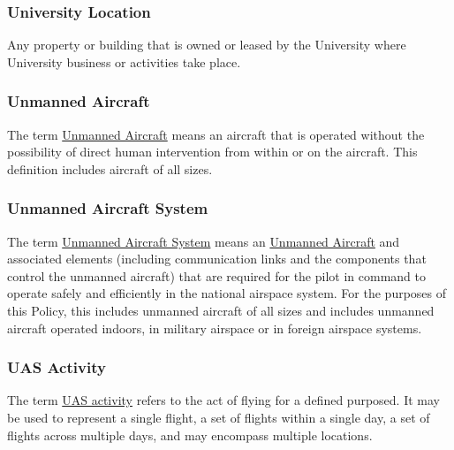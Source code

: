 \documentclass[
]{book}
\begin{document}
\hypertarget{UL}{%
\subsubsection*{University Location}\label{UL}}

Any property or building that is owned or leased by the University where University business or activities take place.



\hypertarget{UA}{%
\subsubsection*{Unmanned Aircraft}\label{UA}}

The term \protect\hyperlink{UA}{Unmanned Aircraft} means an aircraft that is operated without the possibility of direct human intervention from within or on the aircraft. This definition includes aircraft of all sizes.





\hypertarget{UAS}{%
\subsubsection*{Unmanned Aircraft System}\label{UAS}}

The term \protect\hyperlink{UAS}{Unmanned Aircraft System} means an \protect\hyperlink{UA}{Unmanned Aircraft} and associated elements (including communication links and the components that control the unmanned aircraft) that are required for the pilot in command to operate safely and efficiently in the national airspace system. For the purposes of this Policy, this includes unmanned aircraft of all sizes and includes unmanned aircraft operated indoors, in military airspace or in foreign airspace systems.







\hypertarget{UASactivity}{%
\subsubsection*{UAS Activity}\label{UASactivity}}

The term \protect\hyperlink{UASactivity}{UAS activity} refers to the act of flying for a defined purposed. It may be used to represent a single flight, a set of flights within a single day, a set of flights across multiple days, and may encompass multiple locations.
\end{document}
